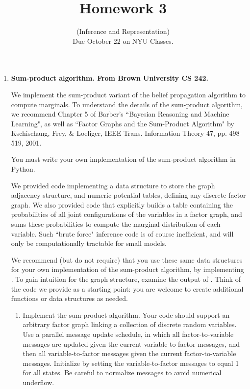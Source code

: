 \documentclass{article}
\date{}
\title{Homework 3}
\author{(Inference and Representation) 
\\ Due October 22 on NYU Classes.  }
\begin{document}
\maketitle

\begin{enumerate}


\item {\bf Sum-product algorithm. From Brown University CS 242.} 

We implement the sum-product variant of the belief propagation algorithm to compute marginals. To understand the details of the sum-product algorithm, we recommend Chapter 5 of Barber's ``Bayesian Reasoning and Machine Learning", as well as ``Factor Graphs and the Sum-Product Algorithm" by Kschischang, Frey, \& Loeliger, IEEE Trans. Information Theory 47, pp. 498-519, 2001.

You must write your own  implementation of the sum-product algorithm in Python.

We  provided code implementing a data structure to store the graph adjacency structure, and numeric potential tables, defining any discrete factor graph. We also provided code that explicitly builds a table containing the probabilities of all joint configurations of the variables in a factor graph, and sums these probabilities to compute the marginal
distribution of each variable. Such ``brute force" inference code is of course inefficient, and will only be computationally tractable for small models.

We recommend (but do not require) that you use these same data structures for your own implementation of the sum-product algorithm, by implementing . To gain intuition for the graph structure, examine the output of . Think of the code we provide as a starting point: you are welcome to create additional functions or data structures as needed. 

\begin{enumerate}
\item Implement the sum-product algorithm. Your code should support an arbitrary factor graph linking a collection of discrete random variables. Use a parallel message update schedule,
in which all factor-to-variable messages are updated given the current variable-to-factor messages, and then all variable-to-factor messages given the current factor-to-variable
messages. Initialize by setting the variable-to-factor messages to equal 1 for all states.
Be careful to normalize messages to avoid numerical underflow.



\end{enumerate}
\end{enumerate}
\end{document}
